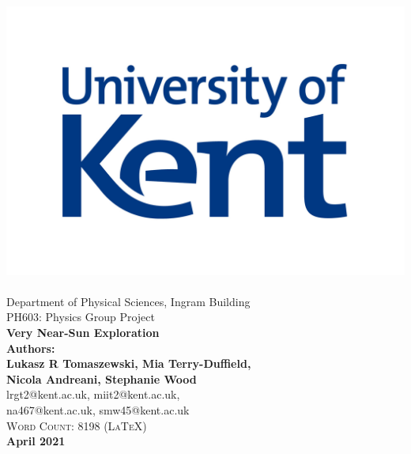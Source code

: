 \begin{titlepage}
\newcommand{\HRule}{\rule{\linewidth}{0.5mm}}
\begin{centering} 
\includegraphics[scale=1.2]{Media/Document/uok.jpg} \\ [-2.2cm]
 \\ [0.1cm]
\large{Department of Physical Sciences, Ingram Building\\PH603: Physics Group Project} \\ [1.0cm]
\Large{\bfseries{Very Near-Sun Exploration}} \\ [1.0cm]
{\large {\bfseries Authors: \\ [0.2cm] Lukasz R Tomaszewski, Mia Terry-Duffield, \\ [-0.2cm] Nicola Andreani, Stephanie Wood}} \\ [0.3cm]
{\large lrgt2@kent.ac.uk, miit2@kent.ac.uk, \\ [-0.2cm] na467@kent.ac.uk, smw45@kent.ac.uk}\\[0.3cm]
\textsc{\large Word Count: 8198 (LaTeX)}\\ [0.8cm]
{\Large \bfseries{April 2021}}\\
\end{centering}
\end{titlepage}
\newpage
\begin{titlepage}
\begin{tableofcontents}
\end{tableofcontents}
\end{titlepage}
\newpage